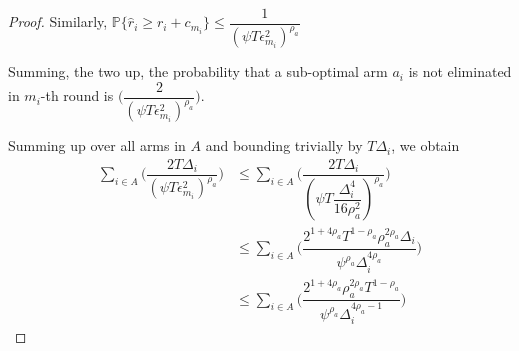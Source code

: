 \begin{proof}
 
Similarly, $\mathbb{P}\lbrace\hat{r}_{i}\geq r_{i} + c_{m_{i}}\rbrace\leq \dfrac{1}{(\psi  T\epsilon_{m_{i}}^{2})^{\rho_{a}}}$
 
Summing, the two up, the probability that a sub-optimal arm $a_{i}$ is not eliminated in $m_{i}$-th round is  $\bigg(\dfrac{2}{(\psi T\epsilon_{m_{i}}^{2})^{\rho_{a}}}\bigg)$. 
 
Summing up over all arms in $A$ and bounding trivially by $T\Delta_{i}$, we obtain
   \begin{align*}
\sum_{i\in A}\bigg(\dfrac{2T\Delta_{i}}{(\psi T\epsilon_{m_{i}}^{2})^{\rho_{a}}}\bigg)
&\leq\sum_{i\in A}\bigg(\dfrac{2T\Delta_{i}}{(\psi T\dfrac{\Delta_{i}^{4}}{16\rho_{a}^{2}})^{\rho_{a}}}\bigg)\\
&\leq \sum_{i\in A}\bigg(\dfrac{2^{1+4\rho_{a}}T^{1-\rho_{a}}\rho_{a}^{2\rho_{a}}\Delta_{i}}{\psi^{\rho_{a}}\Delta_{i}^{4\rho_{a}}}\bigg)\\
&\leq \sum_{i\in A}\bigg(\dfrac{2^{1+4\rho_{a}}\rho_{a}^{2\rho_{a}}T^{1-\rho_{a}}}{\psi^{\rho_{a}}\Delta_{i}^{4\rho_{a}-1}}\bigg)    
   \end{align*}

% 




\end{proof}
